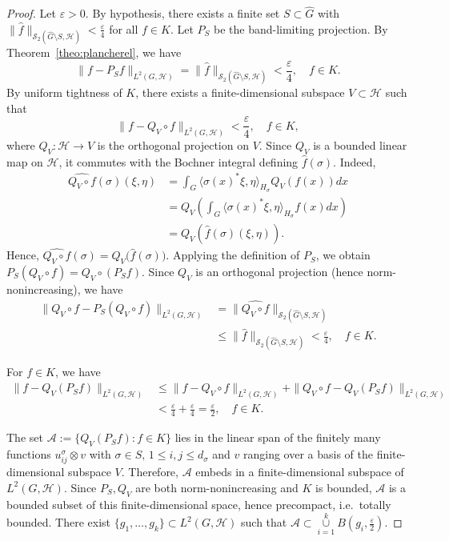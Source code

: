 \documentclass[10pt,a4paper]{amsart}
\def\union{\mathop{\cup }}
\begin{document}
\begin{proof}
Let $\varepsilon>0$.
 By hypothesis, there exists a  finite set 
$S\subset\widehat{G}$ with $\|\widehat f\|_{\mathscr{S}_2(\widehat{G}\setminus S,\mathcal{H})}<\frac{\varepsilon}{4}$ for
all $f\in K$. Let $P_S$ be the band-limiting projection. By Theorem~\ref{theo:plancherel}, we have 
$$
\|f-P_Sf\|_{L^2(G,\mathcal{H})}=\|\widehat f\|_{\mathscr{S}_2(\widehat{G}\setminus S,\mathcal{H})}<
\frac{\varepsilon}{4},\quad f\in K.
$$
By uniform tightness of
$K$, there exists a finite-dimensional subspace $V\subset\mathcal{H}$ such that
$$
\|f-Q_V\!\circ f\|_{L^2(G,\mathcal{H})}<\frac{\varepsilon}{4},\quad f\in K,
$$
where $Q_V:\mathcal{H}\to V$ is the orthogonal projection on $V$. Since $Q_V$ is a bounded linear map on
$\mathcal{H}$, it commutes with the Bochner integral defining $\widehat f(\sigma)$. Indeed,
\begin{align*}
\widehat{Q_V\circ f}(\sigma)(\xi,\eta)&=\int_G\langle \sigma(x)^* \xi,\eta\rangle_{H_\sigma}Q_V(f(x))dx\\
&=Q_V\left(\int_G\langle \sigma(x)^* \xi,\eta\rangle_{H_\sigma}f(x)dx\right)\\
&=Q_V(\widehat f(\sigma)(\xi,\eta)).
\end{align*}
Hence, $\widehat{Q_V\circ f}(\sigma)=Q_V\big(\widehat f(\sigma)\big)$. Applying the definition of $P_S$, we obtain
$P_S(Q_V\!\circ f)=Q_V\!\circ(P_Sf)$. Since $Q_V$ is an orthogonal projection
(hence norm-nonincreasing), we have 
\begin{align*}
\|Q_V\!\circ f-P_S(Q_V\!\circ f)\|_{L^2(G,\mathcal{H})}&=\|\widehat{Q_V\circ f}\|_{\mathscr{S}_2(\widehat{G}\setminus
S,\mathcal{H})}\\
&\le\|\widehat f\|_{\mathscr{S}_2(\widehat{G}\setminus S,\mathcal{H})}<\frac{\varepsilon}{4},\quad f\in K.
\end{align*}

For $f\in K$, we have 
\begin{align*}
\|f-Q_V(P_Sf)\|_{L^2(G,\mathcal{H})}&\le\|f-Q_V\!\circ f\|_{L^2(G,\mathcal{H})}+\|Q_V\!\circ f-Q_V(P_Sf)\|_{L^2(G,\mathcal{H})}\\
&<\frac{\varepsilon}{4}+\frac{\varepsilon}{4}=\frac{\varepsilon}{2},\quad f\in K.
\end{align*}

\noindent The set $\mathcal{A}:=\{Q_V(P_Sf):f\in K\}$ lies in the linear span of the
finitely many functions $u^\sigma_{ij}\otimes v$ with $\sigma\in S, \, 1\leq i,j\leq d_\sigma$ and $v$ ranging over a basis of the finite-dimensional subspace $V$. Therefore,  $\mathcal{A}$ embeds in a finite-dimensional subspace of $L^2(G,\mathcal{H})$. Since $P_S,Q_V$ are both norm-nonincreasing and $K$ is bounded,
$\mathcal{A}$ is a bounded subset of this finite-dimensional space, hence precompact,  i.e.\  totally bounded. There exist $\{g_1,\dots,g_k\}\subset L^2(G,\mathcal{H})$ such that $\mathcal{A}\subset \union\limits_{i=1}^kB(g_i,\frac{\varepsilon}{2})$. 


\end{proof}
\end{document}
